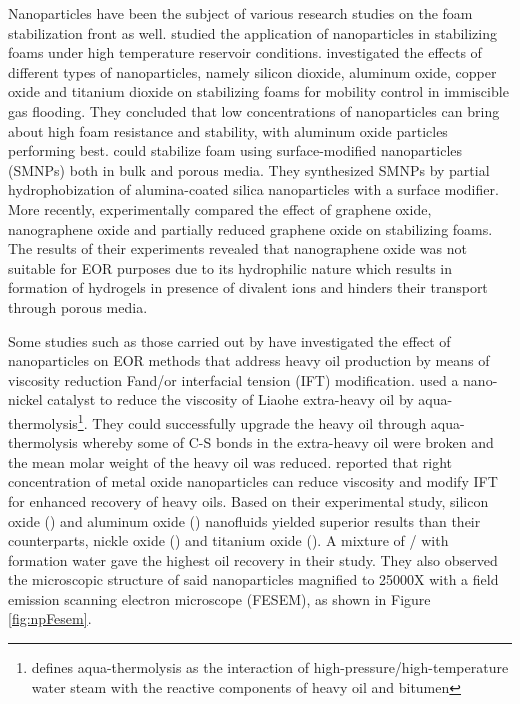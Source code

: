 Nanoparticles have been the subject of various research studies on the foam stabilization front as well. \citet{Zhang2009} studied the application of nanoparticles in stabilizing foams under high temperature reservoir conditions. \citet{Manan2015} investigated the effects of different types of nanoparticles, namely silicon dioxide, aluminum oxide, copper oxide and titanium dioxide on stabilizing  foams for mobility control in immiscible gas flooding. They concluded that low concentrations of nanoparticles can bring about high foam resistance and stability, with aluminum oxide particles performing best. \citet{Singh2016} could stabilize foam using surface-modified nanoparticles (SMNPs) both in bulk and porous media. They synthesized SMNPs by partial hydrophobization of alumina-coated silica nanoparticles with a surface modifier. More recently, \citet{Barrabino2018} experimentally compared the effect of graphene oxide, nanographene oxide and partially reduced graphene oxide on stabilizing  foams. The results of their experiments revealed that nanographene oxide was not suitable for  EOR purposes due to its hydrophilic nature which results in formation of hydrogels in presence of divalent ions and hinders their transport through porous media.

Some studies such as those carried out by \citet{HamediShokrlu2010, HamediShokrlu2013} have investigated the effect of nanoparticles on EOR methods that address heavy oil production by means of viscosity reduction Fand/or interfacial tension (IFT) modification. \citet{LI2007} used a nano-nickel catalyst to reduce the viscosity of Liaohe extra-heavy oil by aqua-thermolysis\footnote{\citet{Hyne1986} defines aqua-thermolysis as the interaction of high-pressure/high-temperature water steam with the reactive components of heavy oil and bitumen}. They could successfully upgrade the heavy oil through aqua-thermolysis whereby some of C-S bonds in the extra-heavy oil were broken and the mean molar weight of the heavy oil was reduced. \citet{Alomair2015} reported that right concentration of metal oxide nanoparticles can reduce viscosity and modify IFT for enhanced recovery of heavy oils. Based on their experimental study, silicon oxide () and aluminum oxide () nanofluids yielded superior results than their counterparts, nickle oxide () and titanium oxide (). A mixture of / with formation water gave the highest oil recovery in their study. They also observed the microscopic structure of said nanoparticles magnified to 25000X with a field emission scanning electron microscope (FESEM), as shown in Figure \ref{fig:npFesem}.


